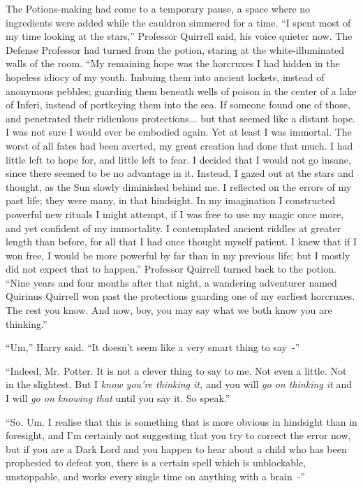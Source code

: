 The Potions-making had come to a temporary pause, a space where no ingredients were added while the cauldron simmered for a time. ``I spent most of my time looking at the stars,'' Professor Quirrell said, his voice quieter now. The Defense Professor had turned from the potion, staring at the white-illuminated walls of the room. ``My remaining hope was the horcruxes I had hidden in the hopeless idiocy of my youth. Imbuing them into ancient lockets, instead of anonymous pebbles; guarding them beneath wells of poison in the center of a lake of Inferi, instead of portkeying them into the sea. If someone found one of those, and penetrated their ridiculous protections... but that seemed like a distant hope. I was not sure I would ever be embodied again. Yet at least I was immortal. The worst of all fates had been averted, my great creation had done that much. I had little left to hope for, and little left to fear. I decided that I would not go insane, since there seemed to be no advantage in it. Instead, I gazed out at the stars and thought, as the Sun slowly diminished behind me. I reflected on the errors of my past life; they were many, in that hindsight. In my imagination I constructed powerful new rituals I might attempt, if I was free to use my magic once more, and yet confident of my immortality. I contemplated ancient riddles at greater length than before, for all that I had once thought myself patient. I knew that if I won free, I would be more powerful by far than in my previous life; but I mostly did not expect that to happen.'' Professor Quirrell turned back to the potion. ``Nine years and four months after that night, a wandering adventurer named Quirinus Quirrell won past the protections guarding one of my earliest horcruxes. The rest you know. And now, boy, you may say what we both know you are thinking.''

``Um,'' Harry said. ``It doesn't seem like a very smart thing to say~-''

``Indeed, Mr. Potter. It is not a clever thing to say to me. Not even a little. Not in the slightest. But I \emph{know you're thinking it,} and you will \emph{go on thinking it} and I will \emph{go on knowing that} until you say it. So speak.''

``So. Um. I realise that this is something that is more obvious in hindsight than in foresight, and I'm certainly not suggesting that you try to correct the error now, but if you are a Dark Lord and you happen to hear about a child who has been prophesied to defeat you, there is a certain spell which is unblockable, unstoppable, and works every single time on anything with a brain~-''

